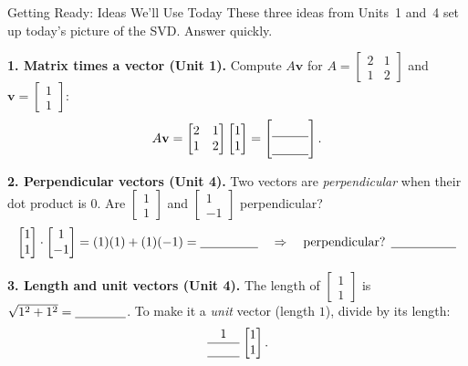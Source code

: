 \documentclass[10pt]{article}
\begin{document}
\namedateperiod

\vspace{0.12in}

\begin{notesbox}{Getting Ready: Ideas We'll Use Today}
\small These three ideas from Units~1 and~4 set up today's picture of the SVD. Answer quickly.

\vspace{4pt}
\textbf{1. Matrix times a vector (Unit 1).} Compute $A\mathbf{v}$ for
$A=\begin{bmatrix} 2 & 1 \\ 1 & 2 \end{bmatrix}$ and $\mathbf{v}=\begin{bmatrix} 1 \\ 1 \end{bmatrix}$:
\[
  A\mathbf{v}=\begin{bmatrix} 2 & 1 \\ 1 & 2 \end{bmatrix}\begin{bmatrix} 1 \\ 1 \end{bmatrix}
  = \begin{bmatrix}\rule{0pt}{1.1em}\blank{1.0cm}\\[2pt]\blank{1.0cm}\end{bmatrix}.
\]

\vspace{4pt}
\textbf{2. Perpendicular vectors (Unit 4).} Two vectors are \emph{perpendicular} when their dot
product is $0$. Are $\begin{bmatrix} 1 \\ 1 \end{bmatrix}$ and $\begin{bmatrix} 1 \\ -1 \end{bmatrix}$
perpendicular?
\[
  \begin{bmatrix} 1 \\ 1 \end{bmatrix}\cdot\begin{bmatrix} 1 \\ -1 \end{bmatrix}
  = (1)(1)+(1)(-1) = \blank{1.6cm}\quad\Rightarrow\quad \text{perpendicular? }\blank{1.8cm}
\]

\vspace{4pt}
\textbf{3. Length and unit vectors (Unit 4).} The length of $\begin{bmatrix} 1 \\ 1 \end{bmatrix}$ is
$\sqrt{1^2+1^2}=\blank{1.4cm}$. To make it a \emph{unit} vector (length $1$), divide by its length:
\[
  \frac{1}{\blank{0.9cm}}\begin{bmatrix} 1 \\ 1 \end{bmatrix}.
\]
\end{notesbox}
\end{document}
